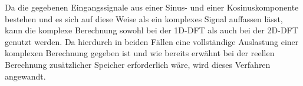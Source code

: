 Da die gegebenen Eingangssignale aus einer Sinus- und einer Kosinuskomponente bestehen und es sich auf diese Weise als ein komplexes Signal auffassen lässt, kann die 
komplexe Berechnung sowohl bei der 1D-DFT als auch bei der 2D-DFT genutzt werden. 
Da hierdurch in beiden Fällen eine vollständige Auslastung einer komplexen Berechnung gegeben ist und wie bereits erwähnt bei der reellen Berechnung zusätzlicher Speicher 
erforderlich wäre, wird dieses Verfahren angewandt.



